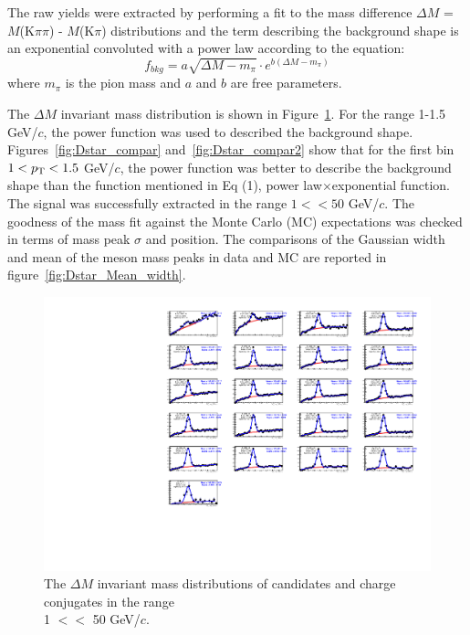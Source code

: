 The \Dstar raw yields were extracted by performing a fit to the mass difference $\Delta M$ = $M$(K$\pi\pi$) - $M$(K$\pi$) distributions and the term describing the background shape is an exponential convoluted with a power law according to the equation:
\begin{equation}
	f_{bkg} = a\sqrt{\Delta M - m_{\pi}}\cdot e^{b(\Delta M - m_{\pi})}
\end{equation}
where $m_{\pi}$ is the pion mass and $a$ and $b$ are free parameters.

The \Dstar $\Delta M$ invariant mass distribution is shown in Figure~\ref{fig:Dstar_InvMass}. For the \pt range 1-1.5 GeV/$c$, the power function was used to described the background shape. Figures~\ref{fig:Dstar_compar} and~\ref{fig:Dstar_compar2} show that for the first \pt bin $1<p_{\rm T}<1.5$ GeV/$c$, the power function was better to describe the background shape than the function mentioned in Eq (1), power law$\times$exponential function. The \Dstar signal was successfully extracted in the range $1<$\pt$<50$ GeV/$c$. The goodness of the mass fit against the Monte Carlo (MC) expectations was checked in terms of mass peak $\sigma$ and position.
The comparisons of the Gaussian width and mean of the \Dstar meson mass peaks in data and MC are reported in figure~\ref{fig:Dstar_Mean_width}.


\begin{figure}[tb]
\begin{center}
 \includegraphics[width=1\textwidth]{figures/Dstar/pp13TeV/DstarInvMass_new.pdf}
\caption{The $\Delta M$ invariant mass distributions of \Dstar candidates and charge conjugates in the \pt range \\ 1 $<$\pt $<$ 50 GeV/$c$.}
\label{fig:Dstar_InvMass}
\end{center}
\end{figure}


